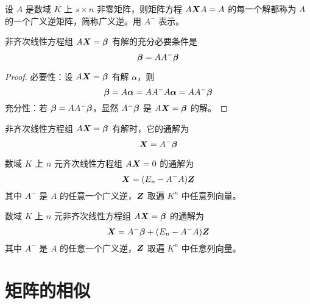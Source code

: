 \begin{definition}[广义逆] 
	设 $A$ 是数域 $K$ 上 $s\times n$ 非零矩阵，则矩阵方程 $A\boldsymbol{X}A = A$ 的每一个解都称为 $A$ 的一个广义逆矩阵，简称广义逆。用 $A^-$ 表示。
\end{definition}

\begin{theorem}
	非齐次线性方程组 $A\boldsymbol{X} = \boldsymbol{\beta}$ 有解的充分必要条件是
	\[\boldsymbol{\beta} = AA^-\boldsymbol{\beta} \]
\end{theorem}

\begin{proof}
	必要性：设 $A \boldsymbol{X}= \boldsymbol{\beta}$ 有解 $\alpha$，则
	\[ \boldsymbol{\beta} = A \boldsymbol{\alpha} = A A^{-} A \boldsymbol{\alpha} = A A^{-} \boldsymbol{\beta}  \]
	充分性：若 $\boldsymbol{\beta} = A A^{-} \boldsymbol{\beta}$，显然 $A^{-} \boldsymbol{\beta}$ 是 $A\boldsymbol{X} = \boldsymbol{\beta}$ 的解。
\end{proof}

\begin{theorem}
	非齐次线性方程组 $A\boldsymbol{X} = \boldsymbol{\beta}$ 有解时，它的通解为
	\[ \boldsymbol{X}  = A^-\boldsymbol{\beta}  \]
\end{theorem}

\begin{theorem}
	数域 $K$ 上 $n$ 元齐次线性方程组 $A\boldsymbol{X} = 0$ 的通解为
	\[ \boldsymbol{X}  = (E_n - A^-A)\boldsymbol{Z} \]
	其中 $A^-$ 是 $A$ 的任意一个广义逆，$\boldsymbol{Z}$ 取遍 $K^n$ 中任意列向量。
\end{theorem}

\begin{theorem}
	数域 $K$ 上 $n$ 元非齐次线性方程组 $A\boldsymbol{X} = \boldsymbol{\beta}$ 的通解为
	\[ \boldsymbol{X}  = A^{-}\boldsymbol{\beta} + (E_n - A^-A)\boldsymbol{Z} \]
	其中 $A^-$ 是 $A$ 的任意一个广义逆，$\boldsymbol{Z}$ 取遍 $K^n$ 中任意列向量。
\end{theorem}


\section{矩阵的相似}

